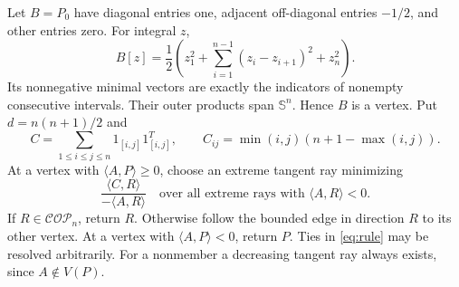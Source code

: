 \documentclass[11pt]{article}
\theoremstyle{remark}\newtheorem{remark}[theorem]{Remark}
\newcommand{\COP}{\mathcal{COP}}
\newcommand{\ip}[2]{\langle #1,#2\rangle}
\begin{document}
Let $B=P_0$ have diagonal entries one, adjacent off-diagonal entries $-1/2$, and other entries zero. For integral $z$,
\begin{equation}\label{eq:B}
 B[z]=\frac12\left(z_1^2+\sum_{i=1}^{n-1}(z_i-z_{i+1})^2+z_n^2\right).
\end{equation}
Its nonnegative minimal vectors are exactly the indicators of nonempty consecutive intervals. Their outer products span $\mathbb S^n$. Hence $B$ is a vertex. Put $d=n(n+1)/2$ and
\begin{equation}\label{eq:C}
 C=\sum_{1\le i\le j\le n}1_{[i,j]}1_{[i,j]}^T,
 \qquad C_{ij}=\min(i,j)(n+1-\max(i,j)).
\end{equation}
At a vertex with $\ip AP\ge0$, choose an extreme tangent ray minimizing
\begin{equation}\label{eq:rule}
 \frac{\ip CR}{-\ip AR}\quad\text{over all extreme rays with }\ip AR<0.
\end{equation}
If $R\in\COP_n$, return $R$. Otherwise follow the bounded edge in direction $R$ to its other vertex. At a vertex with $\ip AP<0$, return $P$. Ties in \eqref{eq:rule} may be resolved arbitrarily. For a nonmember a decreasing tangent ray always exists, since $A\notin V(P)$.
\end{document}
